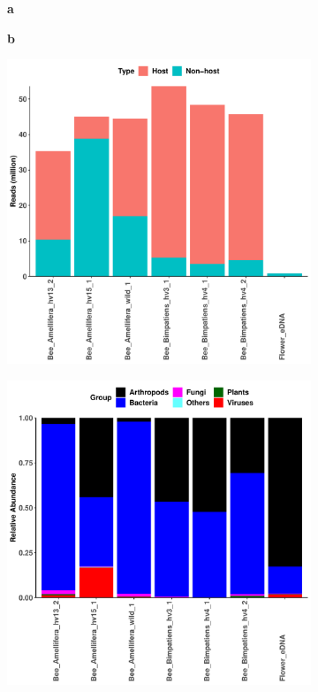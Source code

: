 \documentclass[11pt]{article}
\begin{document}
      \begin{figure}[H]
        \begin{subfigure}
          \centering
          \textbf{a}
        \end{subfigure}
        \hspace{0.5\linewidth}
        \begin{subfigure}
          \centering
          \textbf{b}
        \end{subfigure}
        \newline
        \hfill
        \begin{subfigure}
          \centering
          \includegraphics[width=0.48\linewidth,height=0.48\linewidth]{../Figures/NonHostRatio.pdf}
        \end{subfigure}
        \hfill
        \begin{subfigure}
          \centering
          \includegraphics[width=0.48\linewidth,height=0.48\linewidth]{../Figures/1_species_RelAbundance_GroupAbundance.pdf}
        \end{subfigure}


\end{figure}
\end{document}
